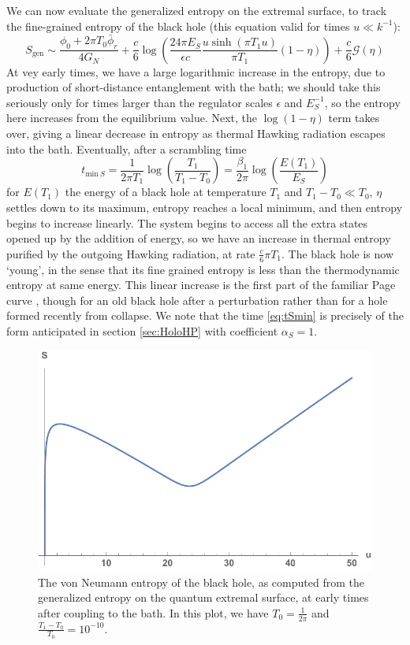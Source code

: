 \documentclass[12pt]{article}
\begin{document}
We can now evaluate the generalized entropy on the extremal surface, to track the fine-grained entropy of the black hole (this equation valid for times $u\ll k^{-1}$):
\begin{equation}\label{eq:SGenPre}
	S_\text{gen} \sim \frac{\phi_0 + 2\pi T_0
	\bar{\phi}_r}{4 G_N} + \frac{c}{6} \log\left(\frac{24\pi E_S}{\epsilon c} \frac{u\sinh(\pi T_1 u)}{\pi T_1} (1-\eta)\right) + \frac{c}{6} \mathcal{G}(\eta)
\end{equation}
At vey early times, we have a large logarithmic increase in the entropy, due to production of short-distance entanglement with the bath; we should take this seriously only for times larger than the regulator scales $\epsilon$ and $E_S^{-1}$, so the entropy here increases from the equilibrium value. Next, the $\log(1-\eta)$ term takes over, giving a linear decrease in entropy as thermal Hawking radiation escapes into the bath. Eventually, after a scrambling time
\begin{equation}
\label{eq:tSmin}
t_{\text{min} \ S} = \frac{1}{2\pi T_1}\log\left(\frac{T_1}{T_1-T_0}\right) = \frac{\beta_1}{2\pi}\log \left(\frac{E(T_1)}{E_S} \right)
\end{equation}
for $E(T_1)$ the energy of a black hole at temperature $T_1$ and  $T_1  - T_0 \ll T_0$, $\eta$ settles down to its maximum, entropy reaches a local minimum, and then entropy begins to increase linearly. The system begins to access all the extra states opened up by the addition of energy, so we have an increase in thermal entropy purified by the outgoing Hawking radiation, at rate $\frac{c}{6}\pi T_1$. The black hole is now `young', in the sense that its fine grained entropy is less than the thermodynamic entropy at same energy. This linear increase is the first part of the familiar Page curve \cite{Page:1993df}, though for an old black hole after a perturbation rather than for a hole formed recently from collapse.  We note that the time \eqref{eq:tSmin} is precisely of the form anticipated in section \ref{sec:HoloHP} with coefficient $\alpha_ {S}=1$.
\begin{figure}
	\centering
	\includegraphics[width=.5\textwidth]{EarlySgen}
	\caption{The von Neumann entropy of the black hole, as computed from the generalized entropy on the quantum extremal surface, at early times after coupling to the bath. In this plot, we have $T_0=\frac{1}{2\pi}$ and $\frac{T_1-T_0}{T_0}=10^{-10}$.}
\label{fig:EarlySgen}
\end{figure}
\end{document}
